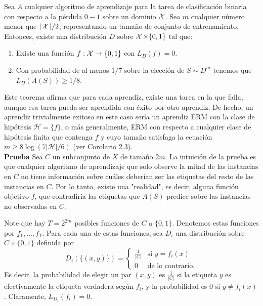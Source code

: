 \begin{teo}
Sea $A$ cualquier algoritmo de aprendizaje para la tarea de clasificación binaria con respecto a la pérdida $0 - 1$ sobre un dominio $\mathop{\mbox{$\mathcal{X}$}}\nolimits$. Sea $m$ cualquier número menor que $|\mathop{\mbox{$\mathcal{X}$}}\nolimits|/2$, representando un tamaño de conjunto de entrenamiento. Entonces, existe una distribución $D$ sobre $\mathop{\mbox{$\mathcal{X}$}}\nolimits \times \{0, 1\}$ tal que:
\begin{enumerate}
    \item Existe una función $f: \mathop{\mbox{$\mathcal{X}$}}\nolimits \rightarrow \{0, 1\}$ con $L_D(f) = 0$.
    \item Con probabilidad de al menos $1/7$ sobre la elección de $S \sim D^m$ tenemos que $L_D(A(S)) \geq 1/8$.
\end{enumerate}
Este teorema afirma que para cada aprendiz, existe una tarea en la que falla, aunque esa tarea pueda ser aprendida con éxito por otro aprendiz. De hecho, un aprendiz trivialmente exitoso en este caso sería un aprendiz ERM con la clase de hipótesis $\mathcal{H} = \{f\}$, o más generalmente, ERM con respecto a cualquier clase de hipótesis finita que contenga $f$ y cuyo tamaño satisfaga la ecuación $m \geq 8 \log(7|\mathcal{H}|/6)$ (ver Corolario 2.3).\\

\textbf{Prueba} Sea $C$ un subconjunto de $X$ de tamaño $2m$. La intuición de la prueba es que cualquier algoritmo de aprendizaje que solo observe la mitad de las instancias en $C$ no tiene información sobre cuáles deberían ser las etiquetas del resto de las instancias en $C$. Por lo tanto, existe una "realidad", es decir, alguna función objetivo $f$, que contradiría las etiquetas que $A(S)$ predice sobre las instancias no observadas en $C$.

Note que hay $T = 2^{2m}$ posibles funciones de $C$ a $\{0, 1\}$. Denotemos estas funciones por $f_1, \ldots, f_T$. Para cada una de estas funciones, sea $D_i$ una distribución sobre $C \times \{0, 1\}$ definida por
$$
D_i(\{(x, y)\}) = 
\begin{cases} 
\frac{1}{|C|} & \text{si } y = f_i(x) \\
0 & \text{de lo contrario}.
\end{cases}
$$
Es decir, la probabilidad de elegir un par $(x, y)$ es $\frac{1}{|C|}$ si la etiqueta $y$ es efectivamente la etiqueta verdadera según $f_i$, y la probabilidad es $0$ si $y \neq f_i(x)$. Claramente, $L_{D_i}(f_i) = 0$.


\end{teo}

